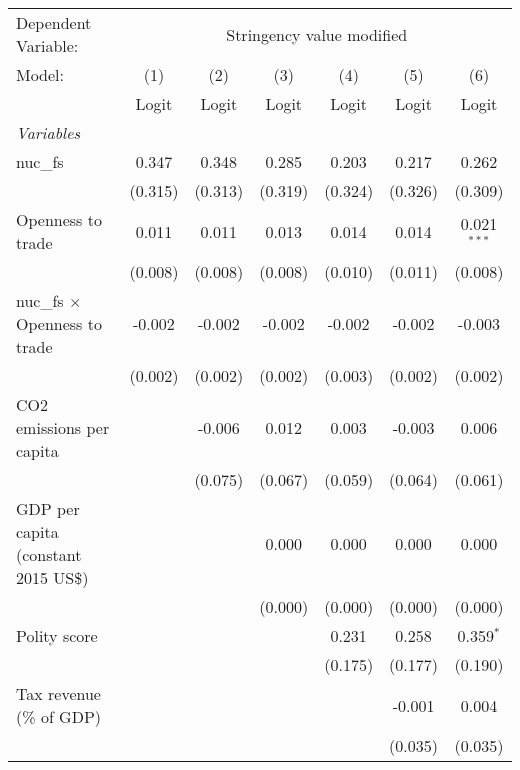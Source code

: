 
\begingroup
\centering
\begin{tabular}{lcccccc}
   \toprule
   Dependent Variable: & \multicolumn{6}{c}{Stringency value modified}\\
   Model:                               & (1)     & (2)     & (3)     & (4)     & (5)     & (6)\\  
                                        &  Logit  & Logit   & Logit   & Logit   & Logit   & Logit\\  
   \midrule
   \emph{Variables}\\
   nuc\_fs                              & 0.347   & 0.348   & 0.285   & 0.203   & 0.217   & 0.262\\   
                                        & (0.315) & (0.313) & (0.319) & (0.324) & (0.326) & (0.309)\\   
   Openness to trade                    & 0.011   & 0.011   & 0.013   & 0.014   & 0.014   & 0.021$^{***}$\\   
                                        & (0.008) & (0.008) & (0.008) & (0.010) & (0.011) & (0.008)\\   
   nuc\_fs $\times$ Openness to trade   & -0.002  & -0.002  & -0.002  & -0.002  & -0.002  & -0.003\\   
                                        & (0.002) & (0.002) & (0.002) & (0.003) & (0.002) & (0.002)\\   
   CO2 emissions per capita             &         & -0.006  & 0.012   & 0.003   & -0.003  & 0.006\\   
                                        &         & (0.075) & (0.067) & (0.059) & (0.064) & (0.061)\\   
   GDP per capita (constant 2015 US\$)  &         &         & 0.000   & 0.000   & 0.000   & 0.000\\   
                                        &         &         & (0.000) & (0.000) & (0.000) & (0.000)\\   
   Polity score                         &         &         &         & 0.231   & 0.258   & 0.359$^{*}$\\   
                                        &         &         &         & (0.175) & (0.177) & (0.190)\\   
   Tax revenue (\% of GDP)              &         &         &         &         & -0.001  & 0.004\\   
                                        &         &         &         &         & (0.035) & (0.035)\\   

\end{tabular}
